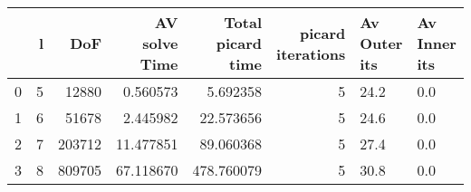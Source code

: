 \begin{tabular}{lrrrrrll}
\toprule
{} &  l &     DoF &  AV solve Time &  Total picard time &  picard iterations & Av Outer its & Av Inner its \\
\midrule
0 &  5 &   12880 &       0.560573 &           5.692358 &                  5 &         24.2 &          0.0 \\
1 &  6 &   51678 &       2.445982 &          22.573656 &                  5 &         24.6 &          0.0 \\
2 &  7 &  203712 &      11.477851 &          89.060368 &                  5 &         27.4 &          0.0 \\
3 &  8 &  809705 &      67.118670 &         478.760079 &                  5 &         30.8 &          0.0 \\
\bottomrule
\end{tabular}
